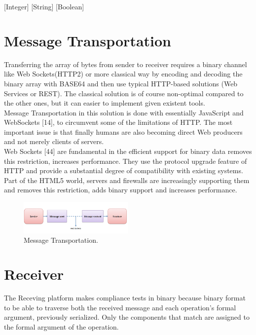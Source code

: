 [Integer]
[String]
[Boolean]


\section{Message Transportation}
\label{section:messageTransfer}

Transferring the array of bytes from sender to receiver requires a binary channel like Web Sockets(HTTP2) or
more classical way by encoding and decoding the binary array with BASE64 and then use typical HTTP-based
solutions (Web Services or REST). The classical solution is of course non-optimal compared to the other ones,
but it can easier to implement given existent tools.\\

Message Transportation in this solution is done with essentially JavaScript and WebSockets [14], to circumvent some of the limitations of HTTP.
The most important issue is that finally humans are also becoming direct Web producers and not merely clients of servers.\\

Web Sockets [44] are fundamental in the efficient support for binary data removes this restriction, increases performance.
They use the protocol upgrade feature of HTTP and
provide a substantial degree of compatibility with existing systems. Part of the HTML5 world, servers and firewalls are
increasingly supporting them and removes this restriction, adds binary support and increases performance.

\begin{figure}[!htb]
  \centering
  \includegraphics[width=0.5\textwidth]{Figures/websocket.png}
  \caption[Message Transportation.]{Message Transportation.}
  \label{fig:websocket}
\end{figure}

\section{Receiver}
\label{section:receiver}

The Receving platform makes compliance tests in binary because binary format to be able to traverse both the received message
and each operation’s formal argument, previously serialized. Only the components that match are assigned to the formal argument of the operation.

